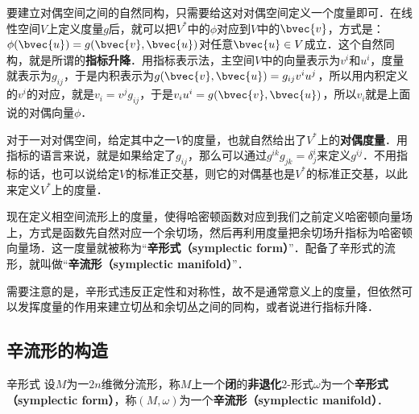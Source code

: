 要建立对偶空间之间的自然同构，只需要给这对对偶空间定义一个度量即可．在线性空间$V$上定义度量$g$后，就可以把$V^*$中的$\phi$对应到$V$中的$\bvec{v}$，方式是：$\phi(\bvec{u})=g(\bvec{v}, \bvec{u})$对任意$\bvec{u}\in V$成立．这个自然同构，就是所谓的\textbf{指标升降}．用指标表示法，主空间$V$中的向量表示为$v^i$和$u^i$，度量就表示为$g_{ij}$，于是内积表示为$g(\bvec{v}, \bvec{u})=g_{ij}v^iu^j$，所以用内积定义的$v^i$的对应，就是$v_i=v^jg_{ij}$，于是$v_iu^i=g(\bvec{v}, \bvec{u})$，所以$v_i$就是上面说的对偶向量$\phi$．

对于一对对偶空间，给定其中之一$V$的度量，也就自然给出了$V^*$上的\textbf{对偶度量}．用指标的语言来说，就是如果给定了$g_{ij}$，那么可以通过$g^{ik}g_{jk}=\delta^i_j$来定义$g^{ij}$．不用指标的话，也可以说给定$V$的标准正交基，则它的对偶基也是$V^*$的标准正交基，以此来定义$V^*$上的度量．

现在定义相空间流形上的度量，使得哈密顿函数对应到我们之前定义哈密顿向量场上，方式是函数先自然对应一个余切场，然后再利用度量把余切场升指标为哈密顿向量场．这一度量就被称为“\textbf{辛形式（symplectic form）}”．配备了辛形式的流形，就叫做“\textbf{辛流形（symplectic manifold）}”．

需要注意的是，辛形式违反正定性和对称性，故不是通常意义上的度量，但依然可以发挥度量的作用来建立切丛和余切丛之间的同构，或者说进行指标升降．


\subsection{辛流形的构造}




\begin{definition}{辛形式}
设$M$为一$2n$维微分流形，称$M$上一个\textbf{闭}的\textbf{非退化}$2$-形式$\omega$为一个\textbf{辛形式（symplectic form）}，称$(M, \omega)$为一个\textbf{辛流形（symplectic manifold）}．
\end{definition}


























